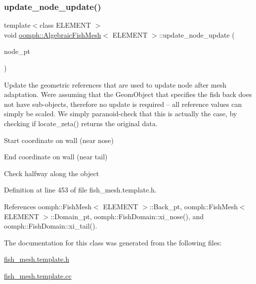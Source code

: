\subsubsection{\texorpdfstring{update\+\_\+node\+\_\+update()}{update\_node\_update()}}
{\footnotesize\ttfamily template$<$class E\+L\+E\+M\+E\+NT $>$ \\
void \hyperlink{classoomph_1_1AlgebraicFishMesh}{oomph\+::\+Algebraic\+Fish\+Mesh}$<$ E\+L\+E\+M\+E\+NT $>$\+::update\+\_\+node\+\_\+update (\begin{DoxyParamCaption}\item[{Algebraic\+Node $\ast$\&}]{node\+\_\+pt }\end{DoxyParamCaption})\hspace{0.3cm}{\ttfamily [inline]}}



Update the geometric references that are used to update node after mesh adaptation. We\textquotesingle{}re assuming that the Geom\+Object that specifies the fish back does not have sub-\/objects, therefore no update is required -- all reference values can simply be scaled. We simply paranoid-\/check that this is actually the case, by checking if locate\+\_\+zeta() returns the original data. 

Start coordinate on wall (near nose)

End coordinate on wall (near tail)

Check halfway along the object 

Definition at line 453 of file fish\+\_\+mesh.\+template.\+h.



References oomph\+::\+Fish\+Mesh$<$ E\+L\+E\+M\+E\+N\+T $>$\+::\+Back\+\_\+pt, oomph\+::\+Fish\+Mesh$<$ E\+L\+E\+M\+E\+N\+T $>$\+::\+Domain\+\_\+pt, oomph\+::\+Fish\+Domain\+::xi\+\_\+nose(), and oomph\+::\+Fish\+Domain\+::xi\+\_\+tail().



The documentation for this class was generated from the following files\+:\begin{DoxyCompactItemize}
\item 
\hyperlink{fish__mesh_8template_8h}{fish\+\_\+mesh.\+template.\+h}\item 
\hyperlink{fish__mesh_8template_8cc}{fish\+\_\+mesh.\+template.\+cc}\end{DoxyCompactItemize}
